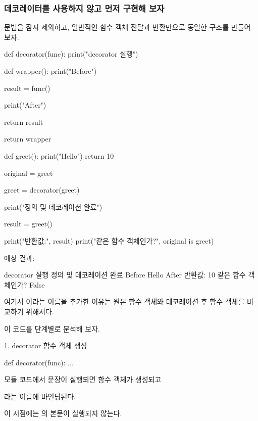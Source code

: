 \subsubsection{데코레이터를 사용하지 않고 먼저 구현해 보자}

 문법을 잠시 제외하고, 일반적인 함수 객체 전달과 반환만으로 동일한 구조를 만들어 보자.

\begin{dhkcode}
def decorator(func):
    print("decorator 실행")

    def wrapper():
        print("Before")

        result = func()

        print("After")

        return result

    return wrapper


def greet():
    print("Hello")
    return 10


original = greet

greet = decorator(greet)

print("정의 및 데코레이션 완료")

result = greet()

print("반환값:", result)
print("같은 함수 객체인가?", original is greet)
\end{dhkcode}

예상 결과:

\begin{dhkzsh}
decorator 실행
정의 및 데코레이션 완료
Before
Hello
After
반환값: 10
같은 함수 객체인가? False
\end{dhkzsh}

여기서 이라는 이름을 추가한 이유는 원본 함수 객체와 데코레이션 후 함수 객체를 비교하기 위해서다.

이 코드를 단계별로 분석해 보자.

\begin{dhknote}
\begin{dhksmry}[centered]
1. decorator 함수 객체 생성
\end{dhksmry}
\end{dhknote}

\begin{dhkcode}
def decorator(func):
    ...
\end{dhkcode}

모듈 코드에서  문장이 실행되면 함수 객체가 생성되고

라는 이름에 바인딩된다.

이 시점에는 의 본문이 실행되지 않는다.

